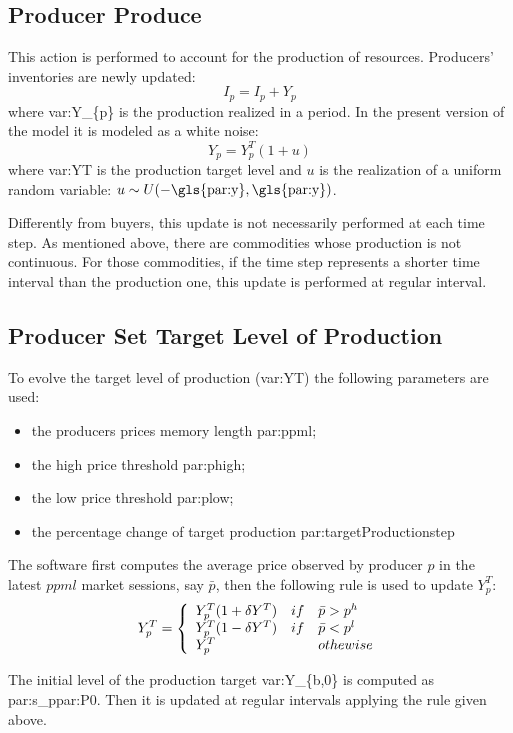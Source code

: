 \documentclass{article}
\begin{document}
\subsection{Producer Produce}

This action is performed to account for the production of resources. Producers' inventories are newly updated:
\[
I_p=I_p+Y_p
\]
where \gls{var:Y_{p}} is the production realized in a period. In the present version of the model it is modeled as a white noise:
\[
	Y_p=Y^T_{p}(1+u)
\]
where \gls{var:YT} is the production target level   
and $u$ is the realization of a uniform random variable: $u\sim U(-\textnormal{\gls{par:y}},\textnormal{\gls{par:y}})$.

Differently from buyers, this update is not necessarily performed at each time step.
As mentioned above, there are commodities whose production is not continuous. For those commodities, if the time step represents a shorter time interval than the production one, this update is performed at regular interval.

\subsection{Producer Set Target Level of Production}

To evolve the target level of production (\gls{var:YT}) the following parameters are used:
\begin{itemize}
	\item the producers prices memory length \gls{par:ppml};
	\item the high price threshold \gls{par:phigh};
	\item the low price threshold  \gls{par:plow};
	\item the percentage change of target production \gls{par:targetProductionstep}
\end{itemize}
  
The software first computes the average price observed by producer $p$ in the latest $ppml$ market sessions, say $\bar{p}$, then the following rule is used to update $Y^T_p$:
\[
	Y^T_p=\left\{\begin{array}{l l l}
		Y^T_p(1+\delta Y^T)& if& \bar{p}>p^h\\
		Y^T_p(1-\delta Y^T)& if& \bar{p}<p^l\\
		Y^T_p& & othewise\\
	\end{array}\right.
\]

The initial level of the production target \gls{var:Y_{b,0}} is computed as \gls{par:s_p}\gls{par:P0}.
Then it is updated at regular intervals applying the rule given above.
\end{document}
